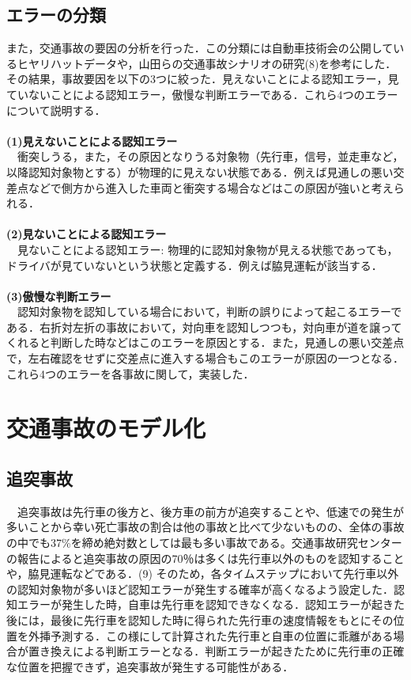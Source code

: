 \documentclass[14pt,a4j]{jsarticle}
\begin{document}
\subsection{エラーの分類}
また，交通事故の要因の分析を行った．この分類には自動車技術会の公開しているヒヤリハットデータや，山田らの交通事故シナリオの研究(8)を参考にした．その結果，事故要因を以下の3つに絞った．見えないことによる認知エラー，見ていないことによる認知エラー，傲慢な判断エラーである．これら4つのエラーについて説明する．\\\\
\textbf{(1)見えないことによる認知エラー}\\
　衝突しうる，また，その原因となりうる対象物（先行車，信号，並走車など，以降認知対象物とする）が物理的に見えない状態である．例えば見通しの悪い交差点などで側方から進入した車両と衝突する場合などはこの原因が強いと考えられる．\\\\
\textbf{(2)見ないことによる認知エラー}\\
　見ないことによる認知エラー: 物理的に認知対象物が見える状態であっても，ドライバが見ていないという状態と定義する．例えば脇見運転が該当する．\\\\
\textbf{(3)傲慢な判断エラー}\\
　認知対象物を認知している場合において，判断の誤りによって起こるエラーである．右折対左折の事故において，対向車を認知しつつも，対向車が道を譲ってくれると判断した時などはこのエラーを原因とする．また，見通しの悪い交差点で，左右確認をせずに交差点に進入する場合もこのエラーが原因の一つとなる．\\
これら4つのエラーを各事故に関して，実装した．
\newpage
\section{交通事故のモデル化}
\subsection{追突事故}
　追突事故は先行車の後方と、後方車の前方が追突することや、低速での発生が多いことから幸い死亡事故の割合は他の事故と比べて少ないものの、全体の事故の中でも37\%を締め絶対数としては最も多い事故である。交通事故研究センターの報告\cite{ITARDA2003}によると追突事故の原因の70％は多くは先行車以外のものを認知することや，脇見運転などである．(9) そのため，各タイムステップにおいて先行車以外の認知対象物が多いほど認知エラーが発生する確率が高くなるよう設定した．認知エラーが発生した時，自車は先行車を認知できなくなる．認知エラーが起きた後には，最後に先行車を認知した時に得られた先行車の速度情報をもとにその位置を外挿予測する．この様にして計算された先行車と自車の位置に乖離がある場合が置き換えによる判断エラーとなる．判断エラーが起きたために先行車の正確な位置を把握できず，追突事故が発生する可能性がある．
\end{document}
